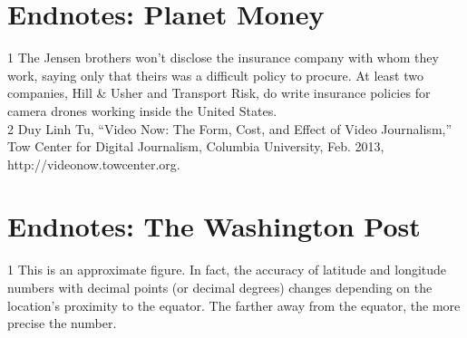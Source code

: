 \begin{itemize}
\section{Endnotes: Planet Money}
1 The Jensen brothers won't disclose the insurance company with whom they work, saying only that
theirs was a difficult policy to procure. At least two companies, Hill & Usher and Transport Risk,
do write insurance policies for camera drones working inside the United States.\\
2 Duy Linh Tu, ``Video Now: The Form, Cost, and Effect of Video Journalism,'' Tow Center for
Digital Journalism, Columbia University, Feb. 2013, http://videonow.towcenter.org.\\

\section{Endnotes: The Washington Post}
1 This is an approximate figure. In fact, the accuracy of latitude and longitude numbers with
decimal points (or decimal degrees) changes depending on the location's proximity to the equator.
The farther away from the equator, the more precise the number.\\


\end{itemize}
